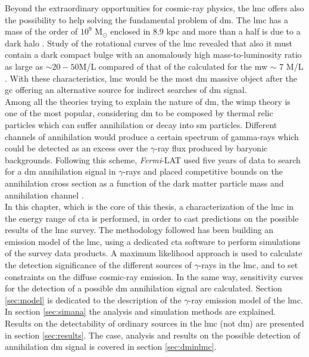 \documentclass[main.tex]{subfiles}
\begin{document}
Beyond the extraordinary opportunities for cosmic-ray physics, the \gls{lmc} offers also the possibility to help solving the fundamental problem of \gls{dm}. The \gls{lmc} has a mass of the order of $10^9$ M$_{\odot}$ enclosed in 8.9 kpc and more than a half is due to a dark halo \cite{2002LMCkinematics}. Study of the rotational curves of the \gls{lmc} revealed that also it must contain a dark compact bulge with an anomalously high mass-to-luminosity ratio as large as $\sim 20-50$M/L \cite{1999LMCbulge} compared of that of the calculated for the \gls{mw} $\sim$ 7 M/L \cite{2013MWbulge}. With these characteristics, \gls{lmc} would be the most \gls{dm} massive object after the \gls{gc} offering an alternative source for indirect searches of \gls{dm} signal.\\
Among all the theories trying to explain the nature of \gls{dm}, the \gls{wimp} theory is one of the most popular, considering \gls{dm} to be composed by thermal relic particles which can suffer annihilation or decay into \gls{sm} particles. Different channels of annihilation would produce a certain spectrum of gamma-rays \cite{2011cirelli} which could be detected as an excess over the $\gamma$-ray flux produced by baryonic backgrounds. Following this scheme, \textit{Fermi}-LAT used five years of data to search for a \gls{dm} annihilation signal in $\gamma$-rays and placed competitive bounds on the annihilation cross section as a function of the dark matter particle mass and annihilation channel \cite{2010FermiLATLMC11months}.\\
In this chapter, which is the core of this thesis, a characterization of the \gls{lmc} in the energy range of \gls{cta} is performed, in order to cast predictions on the possible results of the \gls{lmc} survey. The methodology followed has been building an emission model of the \gls{lmc}, using a dedicated \gls{cta} software to perform simulations of the survey data products. A maximum likelihood approach is used to calculate the detection significance of the different sources of $\gamma$-rays in the \gls{lmc}, and to set constraints on the diffuse cosmic-ray emission. In the same way, sensitivity curves for the detection of a possible \gls{dm} annihilation signal are calculated. Section \ref{sec:model} is dedicated to the description of the $\gamma$-ray emission model of the \gls{lmc}. In section \ref{sec:simana} the analysis and simulation methods are explained. Results on the detectability of ordinary sources in the \gls{lmc} (not \gls{dm}) are presented in section \ref{sec:results}. The case, analysis and results on the possible detection of annihilation \gls{dm} signal is covered in section \ref{sec:dminlmc}.  
\end{document}
